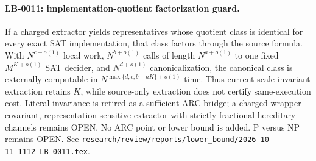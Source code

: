 \paragraph{LB-0011: implementation-quotient factorization guard.}
If a charged extractor yields representatives whose quotient class is
identical for every exact SAT implementation, that class factors through the
source formula.  With $N^{c+o(1)}$ local work, $N^{b+o(1)}$ calls of length
$N^{a+o(1)}$ to one fixed $M^{K+o(1)}$ SAT decider, and
$N^{d+o(1)}$ canonicalization, the canonical class is externally computable
in $N^{\max\{d,c,b+aK\}+o(1)}$ time.  Thus current-scale invariant extraction
retains $K$, while source-only extraction does not certify same-execution
cost.  Literal invariance is retired as a sufficient ARC bridge; a charged
wrapper-covariant, representation-sensitive extractor with strictly
fractional hereditary channels remains OPEN.  No ARC point or lower bound is
added.  P versus NP remains OPEN.  See
\texttt{research/review/reports/lower\_bound/2026-10-11\_1112\_LB-0011.tex}.
